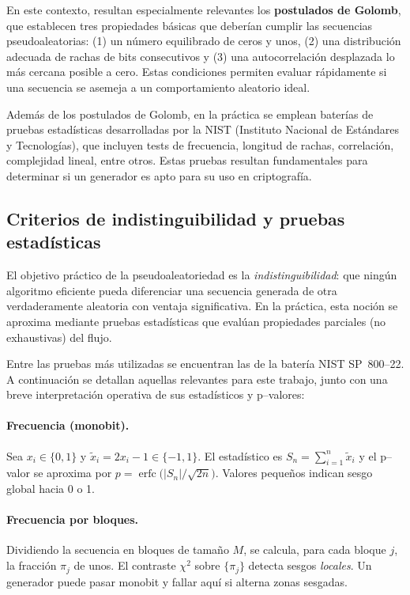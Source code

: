 En este contexto, resultan especialmente relevantes los \textbf{postulados de
Golomb}, que establecen tres propiedades básicas que deberían cumplir las
secuencias pseudoaleatorias: (1) un número equilibrado de ceros y unos, (2) una
distribución adecuada de rachas de bits consecutivos y (3) una autocorrelación
desplazada lo más cercana posible a cero. Estas condiciones permiten evaluar
rápidamente si una secuencia se asemeja a un comportamiento aleatorio ideal.

Además de los postulados de Golomb, en la práctica se emplean baterías de
pruebas estadísticas desarrolladas por la NIST (Instituto Nacional de Estándares y Tecnologías),
que incluyen tests de frecuencia, longitud de rachas, correlación, complejidad lineal,
entre otros. Estas pruebas resultan fundamentales para determinar si un generador
es apto para su uso en criptografía.

\subsection*{Criterios de indistinguibilidad y pruebas estadísticas}

El objetivo práctico de la pseudoaleatoriedad es la \emph{indistinguibilidad}:
que ningún algoritmo eficiente pueda diferenciar una secuencia generada de otra
verdaderamente aleatoria con ventaja significativa. En la práctica, esta noción
se aproxima mediante pruebas estadísticas que evalúan propiedades parciales (no
exhaustivas) del flujo.

Entre las pruebas más utilizadas se encuentran las de la batería NIST SP~800--22.
A continuación se detallan aquellas relevantes para este trabajo, junto con una
breve interpretación operativa de sus estadísticos y p--valores:

\paragraph{Frecuencia (monobit).}
Sea $x_i \in \{0,1\}$ y $\tilde{x}_i = 2x_i-1 \in \{-1,1\}$. El estadístico
es $S_n = \sum_{i=1}^n \tilde{x}_i$ y el p--valor se aproxima por
$p=\operatorname{erfc}\!\big(|S_n|/\sqrt{2n}\big)$. Valores pequeños indican sesgo
global hacia 0 o 1.

\paragraph{Frecuencia por bloques.}
Dividiendo la secuencia en bloques de tamaño $M$, se calcula, para cada bloque
$j$, la fracción $\pi_j$ de unos. El contraste $\chi^2$ sobre $\{\pi_j\}$ detecta
sesgos \emph{locales}. Un generador puede pasar monobit y fallar aquí si alterna
zonas sesgadas.

